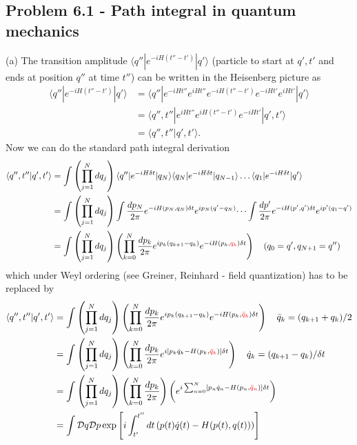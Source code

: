\documentclass[10pt,a4paper]{book}
\theoremstyle{definition}
\begin{document}
\subsection{Problem 6.1 - Path integral in quantum mechanics}
(a) The transition amplitude $\langle q''|e^{-iH(t''-t')}|q'\rangle$ (particle to start at $q',t'$ and ends at position $q''$ at time $t''$) can be written in the Heisenberg picture as
\begin{align}
    \langle q''|e^{-iH(t''-t')}|q'\rangle
    &=\langle q''|e^{-iHt''}e^{iHt''}e^{-iH(t''-t')}e^{-iHt'}e^{iHt'}|q'\rangle\\
    &=\langle q'',t''|e^{iHt''}e^{iH(t''-t')}e^{-iHt'}|q',t'\rangle\\
    &=\langle q'',t''|q',t'\rangle.
\end{align}
Now we can do the standard path integral derivation
\begin{align}
    \langle q'',t''|q',t'\rangle
    &=\int\left(\prod_{j=1}^N dq_j\right) \langle q''|e^{-iH\delta t}|q_N\rangle \langle q_N|e^{-iH\delta t}|q_{N-1}\rangle \dots \langle q_1|e^{-iH\delta t}|q'\rangle\\
    &=\int\left(\prod_{j=1}^N dq_j\right) \int\frac{dp_N}{2\pi}e^{-iH(p_N,q_N)\delta t}e^{ip_N(q'-q_N)} \dots  \int\frac{dp'}{2\pi}e^{-iH(p',q')\delta t}e^{ip'(q_1-q')}\\
    &=\int\left(\prod_{j=1}^N dq_j\right)\left(\prod_{k=0}^{N}\frac{dp_k}{2\pi} e^{ip_k(q_{k+1}-q_k)}e^{-iH(p_k,\textcolor{red}{q_k})\delta t}\right)\quad(q_0=q',q_{N+1}=q'')
\end{align}
which under Weyl ordering (see Greiner, Reinhard - field quantization) has to be replaced by
\begin{align}
    \langle q'',t''|q',t'\rangle
    &=\int\left(\prod_{j=1}^N dq_j\right)\left(\prod_{k=0}^{N}\frac{dp_k}{2\pi} e^{ip_k(q_{k+1}-q_k)}e^{-iH(p_k,\textcolor{red}{\bar{q}_k})\delta t}\right)\quad \bar{q}_k=(q_{k+1}+q_k)/2\\
    &=\int\left(\prod_{j=1}^N dq_j\right)\left(\prod_{k=0}^{N}\frac{dp_k}{2\pi} e^{i[p_k\dot{q}_k-H(p_k,\textcolor{red}{\bar{q}_k})]\delta t}\right)\quad \dot{q}_k=(q_{k+1}-q_k)/{\delta t}\\
    &=\int\left(\prod_{j=1}^N dq_j\right)\left(\prod_{k=0}^{N}\frac{dp_k}{2\pi}\right) \left(e^{i\sum_{n=0}^N[p_n\dot{q}_n-H(p_n,\textcolor{red}{\bar{q}_n})]\delta t}\right)\\
    &=\int\mathcal{D}q\mathcal{D}p\exp\left[i\int_{t'}^{t''}dt\left(p(t)\dot{q}(t)-H(p(t),q(t))\right)\right]
\end{align}
\end{document}
